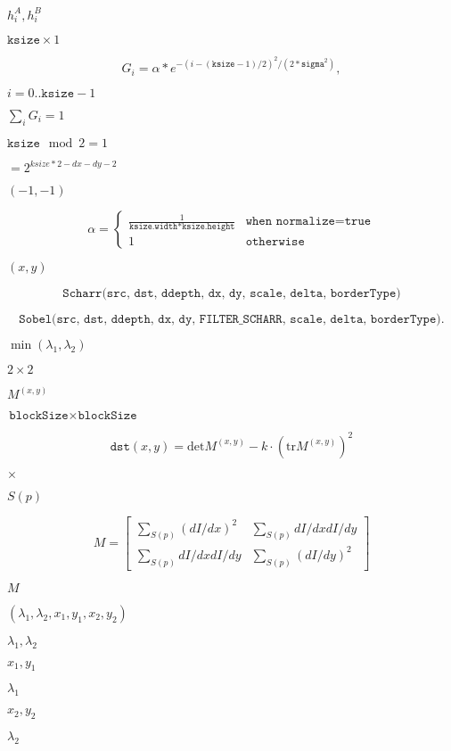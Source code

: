 \documentclass{article}
\begin{document}
$h^A_i, h^B_i$
\pagebreak

$\texttt{ksize} \times 1$
\pagebreak

\[G_i= \alpha *e^{-(i-( \texttt{ksize} -1)/2)^2/(2* \texttt{sigma}^2)},\]
\pagebreak

$i=0..\texttt{ksize}-1$
\pagebreak

$\sum_i G_i=1$
\pagebreak

$\texttt{ksize} \mod 2 = 1$
\pagebreak

$=2^{ksize*2-dx-dy-2}$
\pagebreak

$(-1, -1)$
\pagebreak

\[\alpha = \begin{cases} \frac{1}{\texttt{ksize.width*ksize.height}} & \texttt{when } \texttt{normalize=true} \\1 & \texttt{otherwise}\end{cases}\]
\pagebreak

$ (x, y) $
\pagebreak

\[\texttt{Scharr(src, dst, ddepth, dx, dy, scale, delta, borderType)}\]
\pagebreak

\[\texttt{Sobel(src, dst, ddepth, dx, dy, FILTER_SCHARR, scale, delta, borderType)} .\]
\pagebreak

$\min(\lambda_1, \lambda_2)$
\pagebreak

$2\times2$
\pagebreak

$M^{(x,y)}$
\pagebreak

$\texttt{blockSize} \times \texttt{blockSize}$
\pagebreak

\[\texttt{dst} (x,y) = \mathrm{det} M^{(x,y)} - k \cdot \left ( \mathrm{tr} M^{(x,y)} \right )^2\]
\pagebreak

$\times$
\pagebreak

$S(p)$
\pagebreak

\[M = \begin{bmatrix} \sum _{S(p)}(dI/dx)^2 & \sum _{S(p)}dI/dx dI/dy \\ \sum _{S(p)}dI/dx dI/dy & \sum _{S(p)}(dI/dy)^2 \end{bmatrix}\]
\pagebreak

$M$
\pagebreak

$(\lambda_1, \lambda_2, x_1, y_1, x_2, y_2)$
\pagebreak

$\lambda_1, \lambda_2$
\pagebreak

$x_1, y_1$
\pagebreak

$\lambda_1$
\pagebreak

$x_2, y_2$
\pagebreak

$\lambda_2$
\pagebreak
\end{document}

